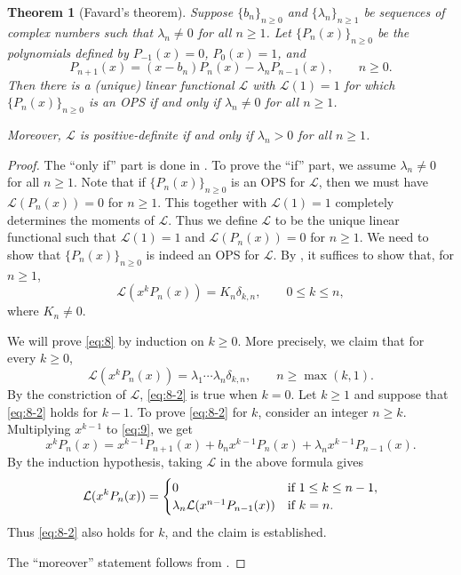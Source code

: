 \documentclass{amsart}
\numberwithin{equation}{section}
\newtheorem{thm}{Theorem}[section]
\theoremstyle{definition}
\newcommand\LL{\mathcal{L}}
\begin{document}
\begin{thm}[Favard's theorem]
  Suppose \( \{b_n\}_{n\ge0} \) and \( \{\lambda_n\}_{n\ge1} \) be
  sequences of complex numbers such that \( \lambda_n\ne0 \) for all
  \( n\ge1 \). Let \( \{ P_n(x) \}_{n\ge 0} \) be the polynomials
  defined by \( P_{-1}(x) = 0 \), \( P_{0}(x) = 1 \), and
  \begin{equation}\label{eq:9}
    P_{n+1}(x) = (x-b_n) P_n(x) - \lambda_n P_{n-1}(x), \qquad n\ge 0.
  \end{equation}
  Then there is a (unique) linear functional \( \LL \) with
  \( \LL(1) = 1 \) for which \( \{ P_n(x) \}_{n\ge 0} \) is an OPS
  if and only if \( \lambda_n\ne 0 \) for all \( n\ge1 \).

  Moreover, \( \LL \) is positive-definite if and only if
  \( \lambda_n>0 \) for all \( n\ge1 \).
\end{thm}

\begin{proof}
  The ``only if'' part is done in . To prove the ``if''
  part, we assume \( \lambda_n\ne 0 \) for all \( n\ge1 \). Note that
  if \( \{ P_n(x) \}_{n\ge 0} \) is an OPS for \( \LL \), then we must
  have \( \LL(P_n(x)) = 0 \) for \( n\ge1 \). This together with
  \( \LL(1) = 1 \) completely determines the moments of \( \LL \).
  Thus we define \( \LL \) to be the unique linear functional such
  that \( \LL(1) = 1 \) and \( \LL(P_n(x)) = 0 \) for \( n\ge1 \). We
  need to show that \( \{ P_n(x) \}_{n\ge 0} \) is indeed an OPS for
  \( \LL \). By , it suffices to show that, for
  \( n\ge1 \),
  \begin{equation}\label{eq:8}
    \LL(x^k P_n(x)) = K_n \delta_{k,n}, \qquad 0\le k\le n,
  \end{equation}
  where \( K_n\ne 0 \).

  We will prove \eqref{eq:8} by induction on \( k\ge0 \). 
  More precisely, we claim that for every \( k\ge0 \),
  \begin{equation}\label{eq:8-2}
    \LL(x^k P_n(x)) = \lambda_1 \cdots \lambda_n \delta_{k,n}, \qquad n\ge \max(k,1).
  \end{equation}
  By the constriction of \( \LL \), \eqref{eq:8-2} is true when
  \( k=0 \). Let \( k\ge1 \) and suppose that \eqref{eq:8-2} holds for
  \( k-1 \). To prove \eqref{eq:8-2} for \( k \), consider an integer
  \( n\ge k \). Multiplying \( x^{k-1} \) to \eqref{eq:9}, we get
  \[
    x^k P_n(x) = x^{k-1} P_{n+1}(x) + b_n x^{k-1}P_n(x)  + \lambda_n x^{k-1} P_{n-1}(x).
  \]
  By the induction hypothesis, taking \( \LL \) in the above formula
  gives
  \[
    \LL(x^k P_n(x)) =
    \begin{cases}
     0 & \mbox{if \( 1\le k\le n-1 \)},\\
     \lambda_n \LL(x^{n-1} P_{n-1}(x)) & \mbox{if \( k=n \).}
    \end{cases}
  \]
  Thus \eqref{eq:8-2} also holds for \( k \), and the claim is
  established.

  The ``moreover'' statement follows from .
\end{proof}
\end{document}
